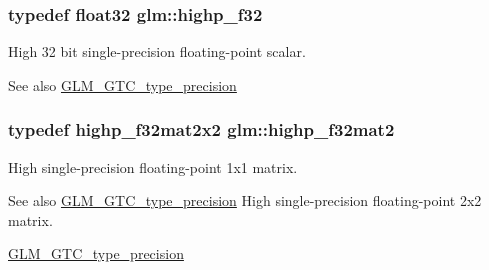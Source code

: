 \subsubsection[{\texorpdfstring{highp\+\_\+f32}{highp_f32}}]{\setlength{\rightskip}{0pt plus 5cm}typedef float32 {\bf glm\+::highp\+\_\+f32}}\hypertarget{group__gtc__type__precision_ga48d80b6fd3a40b71b2e414493832d1ca}{}\label{group__gtc__type__precision_ga48d80b6fd3a40b71b2e414493832d1ca}
High 32 bit single-\/precision floating-\/point scalar. \begin{DoxySeeAlso}{See also}
\hyperlink{group__gtc__type__precision}{G\+L\+M\+\_\+\+G\+T\+C\+\_\+type\+\_\+precision} 
\end{DoxySeeAlso}
\subsubsection[{\texorpdfstring{highp\+\_\+f32mat2}{highp_f32mat2}}]{\setlength{\rightskip}{0pt plus 5cm}typedef highp\+\_\+f32mat2x2 {\bf glm\+::highp\+\_\+f32mat2}}\hypertarget{group__gtc__type__precision_gaed934f561aaf8ad891c0a8f5e719aea8}{}\label{group__gtc__type__precision_gaed934f561aaf8ad891c0a8f5e719aea8}
High single-\/precision floating-\/point 1x1 matrix. \begin{DoxySeeAlso}{See also}
\hyperlink{group__gtc__type__precision}{G\+L\+M\+\_\+\+G\+T\+C\+\_\+type\+\_\+precision} High single-\/precision floating-\/point 2x2 matrix. 

\hyperlink{group__gtc__type__precision}{G\+L\+M\+\_\+\+G\+T\+C\+\_\+type\+\_\+precision} 
\end{DoxySeeAlso}
